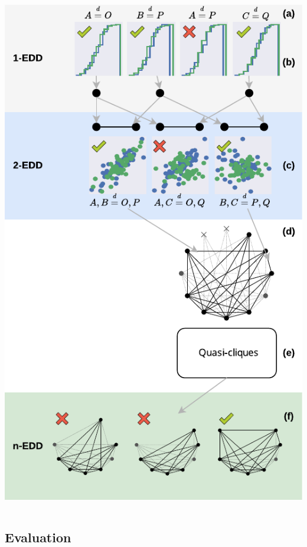\documentclass[10pt]{beamer}
\begin{document}
\begin{frame}{}
\begin{columns}
\begin{column}{.5\linewidth}
        \includegraphics[width=0.9\linewidth]{pipeline}
    \end{column}
    \end{columns}
\end{frame}

\subsection{Evaluation}
\end{document}
